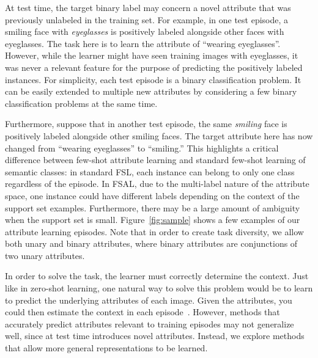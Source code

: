 At test time, the target binary label may concern a novel attribute that was
previously unlabeled in the training set. For example, in one test episode, a
smiling face with \emph{eyeglasses} is positively labeled alongside other faces
with eyeglasses. The task here is to learn the attribute of ``wearing
eyeglasses''. However, while the learner might have seen training images with
eyeglasses, it was never a relevant feature for the purpose of predicting the
positively labeled instances. For simplicity, each test episode is a binary classification problem. It can be easily extended to multiple new attributes by considering a few binary classification problems at the same time.

Furthermore, suppose that in another test episode, the same \emph{smiling} face
is positively labeled alongside other smiling faces. The target attribute here
has now changed from ``wearing eyeglasses'' to ``smiling.'' This highlights a
critical difference between few-shot attribute learning and standard few-shot
learning of semantic classes: in standard FSL, each instance can belong to only
one class regardless of the episode. In FSAL, due to the multi-label nature of
the attribute space, one instance could have different labels depending on the
context of the support set examples. Furthermore, there may be a large amount
of ambiguity when the support set is small. Figure~\ref{fig:sample} shows a few
examples of our attribute learning episodes. Note that in order to create task
diversity, we allow both unary and binary attributes, where binary attributes
are conjunctions of two unary attributes.

In order to solve the \taskname{} task, the learner must correctly determine
the context. Just like in zero-shot learning, one natural way to solve this
problem would be to learn to predict the underlying attributes of each image.
Given the attributes, you could then estimate the context in each
episode~\citep{attributezsl}. However, methods that accurately predict
attributes relevant to training episodes may not generalize well, since at test
time \taskname{} introduces novel attributes. Instead, we explore methods that
allow more general representations to be learned.

